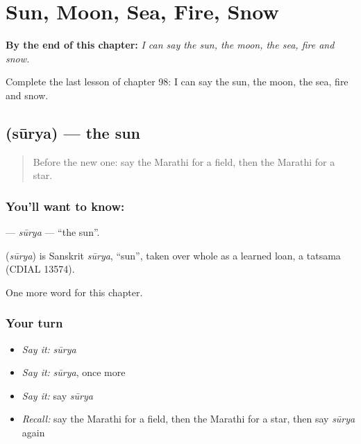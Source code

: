 
\chapter{Sun, Moon, Sea, Fire, Snow}
\label{ch:mr-sun-moon-sea-fire-snow}

\begin{chapteropening}
\textbf{By the end of this chapter:} \emph{I can say the sun, the moon, the sea, fire and snow.}

Complete the last lesson of chapter 98: I can say the sun, the moon, the sea, fire and snow.
\end{chapteropening}

\section[\texorpdfstring{\mr{सूर्य} (sūrya)}{सूर्य (sūrya)}]{ (sūrya) — the sun}

\label{lesson:MR-C98-surya}



\begin{quote}
Before the new one: say the Marathi for a field, then the Marathi for a star.
\end{quote}

\subsection*{You'll want to know: }
\textbf{} — \emph{sūrya} — \textquotedblleft{}the sun\textquotedblright{}.

\begin{cousinweb}
\textbf{} (\emph{sūrya}) is Sanskrit \emph{sūrya}, \textquotedblleft{}sun\textquotedblright{}, taken over whole as a learned loan, a tatsama (CDIAL 13574).
\end{cousinweb}

\begin{grammarlens}[title={What you've built}]
One more word for this chapter.
\end{grammarlens}

\subsection*{Your turn}
\begin{itemize}
\raggedright
  \item \emph{Say it:} \emph{sūrya}
  \item \emph{Say it:} \emph{sūrya}, once more
  \item \emph{Say it:} say \emph{sūrya}
  \item \emph{Recall:} say the Marathi for a field, then the Marathi for a star, then say \emph{sūrya} again
\end{itemize}

